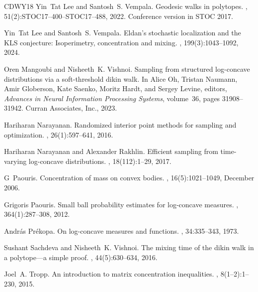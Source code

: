 \documentclass[11pt]{article}
\numberwithin{equation}{section}
\theoremstyle{definition}
\begin{document}
\begin{thebibliography}{CDWY18}
Yin~Tat Lee and Santosh~S. Vempala.
\newblock Geodesic walks in polytopes.
, 51(2):STOC17--400--STOC17--488,
  2022.
\newblock Conference version in STOC 2017.

Yin~Tat Lee and Santosh~S. Vempala.
\newblock Eldan's stochastic localization and the {KLS} conjecture:
  Isoperimetry, concentration and mixing.
, 199(3):1043--1092, 2024.

Oren Mangoubi and Nisheeth~K. Vishnoi.
\newblock Sampling from structured log-concave distributions via a
  soft-threshold dikin walk.
\newblock In Alice Oh, Tristan Naumann, Amir Globerson, Kate Saenko, Moritz
  Hardt, and Sergey Levine, editors, {\em Advances in Neural Information
  Processing Systems}, volume~36, pages 31908--31942. Curran Associates, Inc.,
  2023.

Hariharan Narayanan.
\newblock Randomized interior point methods for sampling and optimization.
, 26(1):597--641, 2016.

Hariharan Narayanan and Alexander Rakhlin.
\newblock Efficient sampling from time-varying log-concave distributions.
, 18(112):1--29, 2017.

G~Paouris.
\newblock Concentration of mass on convex bodies.
, 16(5):1021--1049, December 2006.

Grigoris Paouris.
\newblock Small ball probability estimates for log-concave measures.
,
  364(1):287--308, 2012.

Andr{\'a}s Pr{\'e}kopa.
\newblock On log-concave measures and functions.
, 34:335--343, 1973.

Sushant Sachdeva and Nisheeth~K. Vishnoi.
\newblock The mixing time of the dikin walk in a polytope---a simple proof.
, 44(5):630--634, 2016.

Joel~A. Tropp.
\newblock An introduction to matrix concentration inequalities.
, 8(1--2):1--230,
  2015.

\end{thebibliography}
\end{document}
